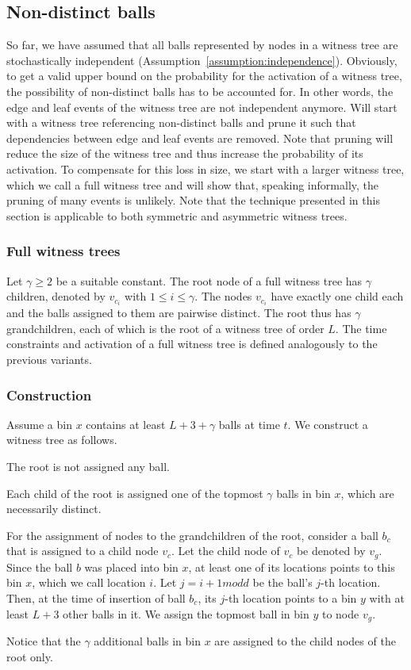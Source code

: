 \documentclass[a4paper,12pt]{article}
\begin{document}
\subsection{Non-distinct balls}
\label{sec:analysis:nondistinctBalls}
So far, we have assumed that all balls represented by nodes in a witness tree are stochastically independent (Assumption~\ref{assumption:independence}). Obviously, to get a valid upper bound on the probability for the activation of a witness tree, the possibility of non-distinct balls has to be accounted for. In other words, the edge and leaf events of the witness tree are not independent anymore. Will start with a witness tree referencing non-distinct balls and prune it such that dependencies between edge and leaf events are removed. Note that pruning will reduce the size of the witness tree and thus increase the probability of its activation. To compensate for this loss in size, we start with a larger witness tree, which we call a full witness tree and will show that, speaking informally, the pruning of many events is unlikely. Note that the technique presented in this section is applicable to both symmetric and asymmetric witness trees. 

\subsubsection{Full witness trees}
\label{sec:analysis:FullWT}
Let $\gamma \geq 2$ be a suitable constant. The root node of a full witness tree has $\gamma$ children, denoted by $v_{c_i}$ with $1\leq i \leq \gamma$. The nodes $v_{c_i}$ have exactly one child each and the balls assigned to them are pairwise distinct. The root thus has $\gamma$ grandchildren, each of which is the root of a witness tree of order $L$. The time constraints and activation of a full witness tree is defined analogously to the previous variants.

\subsubsection{Construction}
\label{sec:analysis:constructionFullWT}
Assume a bin $x$ contains at least $L+3+\gamma$ balls at time $t$. We construct a witness tree as follows.
\begin{compactitem}
\item The root is not assigned any ball.
\item Each child of the root is assigned one of the topmost $\gamma$ balls in bin $x$, which are necessarily distinct.
\item For the assignment of nodes to the grandchildren of the root, consider a ball $b_c$ that is assigned to a child node $v_c$. Let the child node of $v_c$ be denoted by $v_g$. Since the ball $b$ was placed into bin $x$, at least one of its locations points to this bin $x$, which we call location $i$. Let $j = i+1 mod d$ be the ball's $j$-th location. Then, at the time of insertion of ball $b_c$, its $j$-th location points to a bin $y$ with at least $L+3$ other balls in it. We assign the topmost ball in bin $y$ to node $v_g$.
\end{compactitem}
Notice that the $\gamma$ additional balls in bin $x$ are assigned to the child nodes of the root only. 
\end{document}
